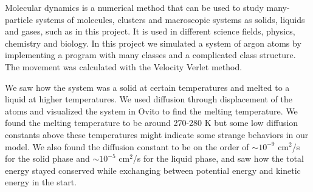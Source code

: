Molecular dynamics is a numerical method that can be used to study many-particle systems of molecules, clusters and macroscopic systems as solids, liquids and gases, such as in this project. It is used in different science fields, physics, chemistry and biology. In this project we simulated a system of argon atoms by implementing a program with many classes and a complicated class structure. The movement was calculated with the Velocity Verlet method. 

We saw how the system was a solid at certain temperatures and melted to a liquid at higher temperatures. We used diffusion through displacement of the atoms and visualized the system in Ovito to find the melting temperature. We found the melting temperature to be around 270-280 K but some low diffusion constants above these temperatures might indicate some strange behaviors in our model. We also found the diffusion constant to be on the order of $\sim 10^{-9}$ cm$^2$/s for the solid phase and $\sim 10^{-5}$ cm$^2$/s for the liquid phase, and saw how the total energy stayed conserved while exchanging between potential energy and kinetic energy in the start. 